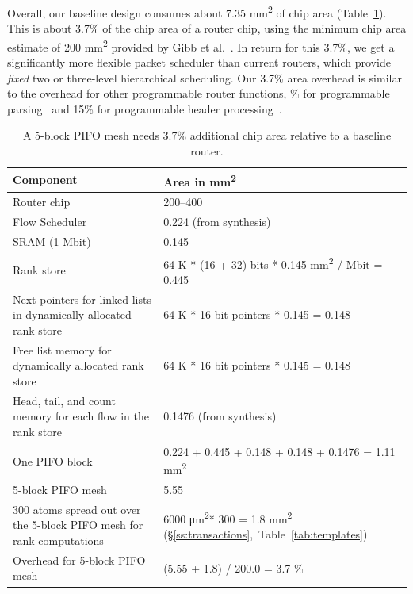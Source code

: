 Overall, our baseline design consumes about 7.35 \si{\milli\metre\squared} of
chip area (Table~\ref{tab:area_overheads}). This is about 3.7\% of the chip
area of a router chip, using the minimum chip area estimate of 200
\si{\milli\metre\squared} provided by Gibb et al.~\cite{glen_parsing}. In
return for this 3.7\%, we get a significantly more flexible packet scheduler
than current routers, which provide {\em fixed} two or three-level hierarchical
scheduling. Our 3.7\% area overhead is similar to the overhead for other
programmable router functions, \% for programmable
parsing~\cite{glen_parsing} and 15\% for programmable header
processing~\cite{rmt}.
 
\begin{table}[!h]
  \centering
  \begin{small}
  \begin{tabular}{|p{}|p{}|}
  \hline
  Component & Area in \si{\milli\metre\squared}\\
  \hline
  Router chip & 200--400~\cite{glen_parsing} \\
  \hline
  Flow Scheduler & 0.224 (from synthesis) \\
  \hline
  SRAM (1 Mbit) & 0.145~\cite{sram_estimate} \\
  \hline
  Rank store & 64 K * (16 + 32) bits * 0.145 \si{\milli\metre\squared} / Mbit = 0.445 \\
  \hline
  Next pointers for linked lists in dynamically allocated rank store & 64 K * 16 bit pointers * 0.145 = 0.148 \\
  \hline
  Free list memory for dynamically allocated rank store & 64 K * 16 bit pointers * 0.145 = 0.148 \\
  \hline
  Head, tail, and count memory for each flow in the rank store & 0.1476 (from synthesis) \\
  \hline
  One PIFO block & 0.224 + 0.445 + 0.148 + 0.148 + 0.1476 = 1.11 \si{\milli\metre\squared} \\
  \hline
  5-block PIFO mesh & 5.55 \\
  \hline
  300 atoms spread out over the 5-block PIFO mesh for rank computations & 6000 \si{\micro\metre\squared}* 300 = 1.8 \si{\milli\metre\squared} (\S\ref{ss:transactions},~Table~\ref{tab:templates})\\
  \hline
  Overhead for 5-block PIFO mesh & (5.55 + 1.8) / 200.0 = 3.7 \% \\
  \hline
  \end{tabular}
\end{small}
\caption{A 5-block PIFO mesh needs 3.7\% additional chip area relative to
a baseline router.}
\label{tab:area_overheads}
\end{table}

